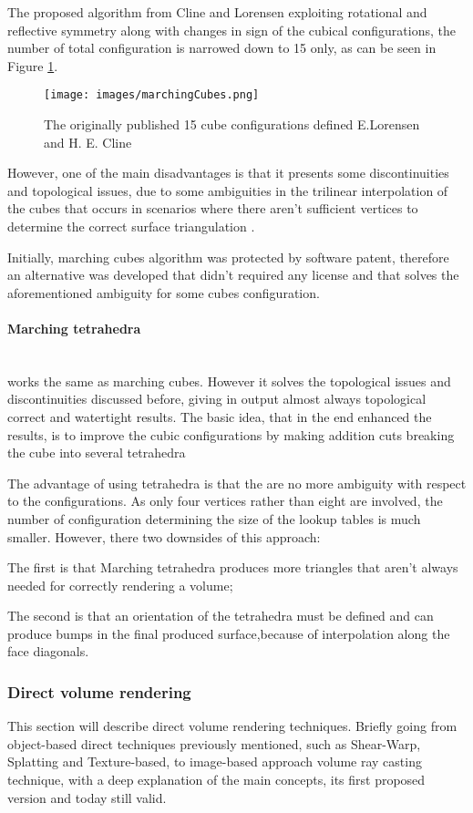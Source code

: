 \documentclass[12pt,a4paper]{extarticle}
\newcommand{\myparagraph}[1]{\paragraph{#1}\mbox{}\\}
\begin{document}
The proposed algorithm from Cline and Lorensen exploiting rotational and reflective symmetry along with changes in sign of the cubical configurations, the number of total configuration is narrowed down to 15 only, as can be seen in Figure \ref{fig:marchingcubes_configs}. 

\begin{figure}[hbtp]
\centering
\texttt{[image: images/marchingCubes.png]}
\caption{The originally published 15 cube configurations defined E.Lorensen and H. E. Cline}
\label{fig:marchingcubes_configs}
\end{figure}

However, one of the main disadvantages is that it presents some discontinuities and topological issues, due to some ambiguities in the trilinear interpolation of the cubes that occurs in scenarios where there aren't sufficient vertices to determine the correct surface triangulation \cite{Lorensen:1987:MCH:37402.37422}.

Initially, marching cubes algorithm was protected by software patent, therefore an alternative was developed that didn't required any license and that solves the aforementioned ambiguity for some cubes configuration.

\myparagraph{Marching tetrahedra} works the same as marching cubes. However it solves the topological issues and discontinuities discussed before, giving in output almost always topological correct and watertight results.
The basic idea, that in the end enhanced the results, is to improve the cubic configurations by making addition cuts breaking the cube into several tetrahedra \cite{Doi1991Jan}

The advantage of using tetrahedra is that the are no more ambiguity with respect to the configurations. As only four vertices rather than eight are involved, the number of configuration determining the size of the lookup tables is much smaller. However, there two downsides of this approach:

The first  is that Marching tetrahedra produces more triangles that aren't always needed for correctly rendering a volume; 

The second is that an orientation of the tetrahedra must be defined and can produce bumps in the final produced surface,because of interpolation along the face diagonals.

\subsubsection{Direct volume rendering} %
This section will describe direct volume rendering techniques. Briefly going from object-based direct techniques previously mentioned, such as Shear-Warp, Splatting and Texture-based, to image-based approach volume ray casting technique, with a deep explanation of the main concepts, its first proposed version and today still valid.
\end{document}
